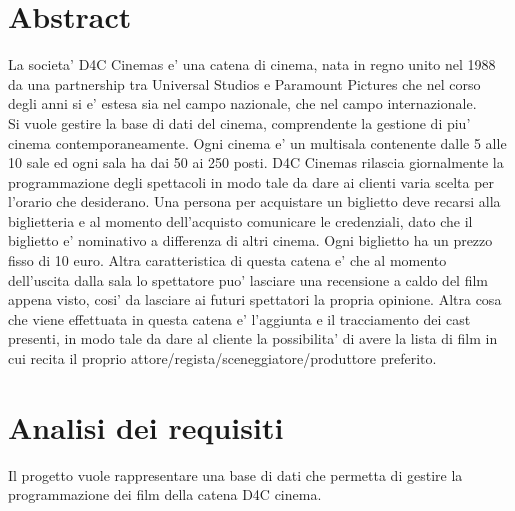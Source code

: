 \documentclass[10pt]{article}
\begin{document}
\begin{titlepage}
		\vfill\vfill\vfill %
		
		
		
		
		
		\vfill %
		\tableofcontents
	\end{titlepage}
	\section{Abstract}	
	La societa' D4C Cinemas e' una catena di cinema, nata in regno unito nel 1988 da una partnership tra Universal Studios e Paramount Pictures che nel corso degli anni si e' estesa sia nel campo nazionale, che nel campo internazionale. \\
	Si vuole gestire la base di dati del cinema, comprendente la gestione di piu' cinema contemporaneamente. Ogni cinema e' un multisala contenente dalle 5 alle 10 sale ed ogni sala ha dai 50 ai 250 posti. D4C Cinemas rilascia giornalmente la programmazione degli spettacoli in modo tale da dare ai clienti varia scelta per l'orario che desiderano. Una persona per acquistare un biglietto deve recarsi alla biglietteria e al momento dell'acquisto comunicare le credenziali, dato che il biglietto e' nominativo a differenza di altri cinema. Ogni biglietto ha un prezzo fisso di 10 euro. Altra caratteristica di questa catena e' che al momento dell'uscita dalla sala lo spettatore puo' lasciare una recensione a caldo del film appena visto, cosi' da lasciare ai futuri spettatori la propria opinione. Altra cosa che viene effettuata in questa catena e' l'aggiunta e il tracciamento dei cast presenti, in modo tale da dare al cliente la possibilita' di avere la lista di film in cui recita il proprio attore/regista/sceneggiatore/produttore preferito.
	\section{Analisi dei requisiti}
	
	Il progetto vuole rappresentare una base di dati che permetta di gestire la programmazione dei film della catena D4C cinema.
			
\end{document}
